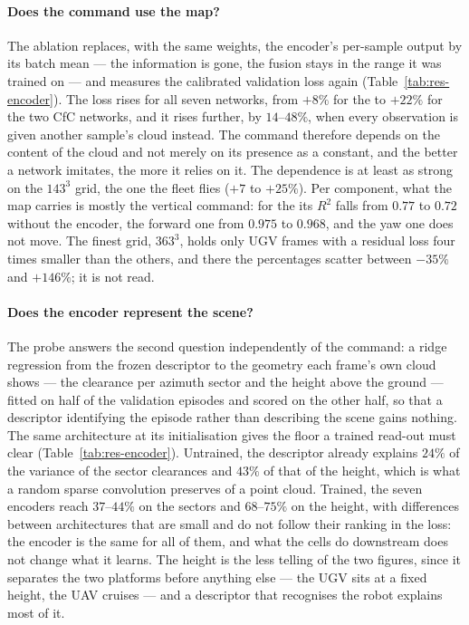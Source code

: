 \paragraph{Does the command use the map?}
The ablation replaces, with the same weights, the encoder's per-sample output
by its batch mean --- the information is gone, the fusion stays in the range it
was trained on --- and measures the calibrated validation loss again
(Table~\ref{tab:res-encoder}). The loss rises for all seven networks, from
$+8\%$ for the  to $+22\%$ for the two CfC networks, and
it rises further, by $14$--$48\%$, when every observation is given another
sample's cloud instead. The command therefore depends on the content of the
cloud and not merely on its presence as a constant, and the better a network
imitates, the more it relies on it. The dependence is at least as strong on the
$143^3$ grid, the one the fleet flies ($+7$ to $+25\%$). Per component, what the
map carries is mostly the vertical command: for the 
its $R^2$ falls from $0.77$ to $0.72$ without the encoder, the forward one from
$0.975$ to $0.968$, and the yaw one does not move. The finest grid, $363^3$,
holds only UGV frames with a residual loss four times smaller than the others,
and there the percentages scatter between $-35\%$ and $+146\%$; it is not read.

\paragraph{Does the encoder represent the scene?}
The probe answers the second question independently of the command: a ridge
regression from the frozen descriptor to the geometry each frame's own cloud
shows --- the clearance per azimuth sector and the height above the ground ---
fitted on half of the validation episodes and scored on the other half, so that
a descriptor identifying the episode rather than describing the scene gains
nothing. The same architecture at its initialisation gives the floor a trained
read-out must clear (Table~\ref{tab:res-encoder}). Untrained, the descriptor
already explains $24\%$ of the variance of the sector clearances and $43\%$ of
that of the height, which is what a random sparse convolution preserves of a
point cloud. Trained, the seven encoders reach $37$--$44\%$ on the sectors and
$68$--$75\%$ on the height, with differences between architectures that are
small and do not follow their ranking in the loss: the encoder is the same for
all of them, and what the cells do downstream does not change what it learns.
The height is the less telling of the two figures, since it separates the two
platforms before anything else --- the UGV sits at a fixed height, the UAV
cruises --- and a descriptor that recognises the robot explains most of it.

